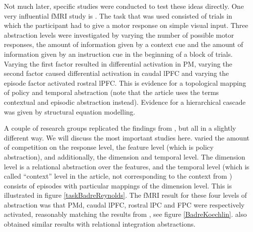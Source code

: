 \documentclass[10pt,a4paper]{report}
\begin{document}
Not much later, specific studies were conducted to test these ideas directly. One very influential fMRI study is \citet{Koechlin2003}. The task that was used consisted of trials in which the participant had to give a motor response on simple visual input. Three abstraction levels were investigated by varying the number of possible motor responses, the amount of information given by a context cue and the amount of information given by an instruction cue in the beginning of a block of trials. Varying the first factor resulted in differential activation in PM, varying the second factor caused differential activation in caudal lPFC and varying the episode factor activated rostral lPFC. This is evidence for a topological mapping of policy and temporal abstraction (note that the article uses the terms contextual and episodic abstraction instead). Evidence for a hierarchical cascade was given by structural equation modelling. 

A couple of research groups replicated the findings from \citet{Koechlin2003}, but all in a slightly different way. We will discuss the most important studies here. \citet{Badre2007} varied the amount of competition on the response level, the feature level (which is policy abstraction), and additionally, the dimension and temporal level. The dimension level is a relational abstraction over the features, and the temporal level (which is called ``context'' level in the article, not corresponding to the context from \citet{Koechlin2003}) consists of episodes with particular mappings of the dimension level. This is illustrated in figure \ref{taskBadreReynolds}. The fMRI result for these four levels of abstraction was that PMd, caudal lPFC, rostral lPC and FPC were respectively activated, reasonably matching the results from \citet{Koechlin2003}, see figure \ref{BadreKoechlin}. \citet{Krawczyk2011} also obtained similar results with relational integration abstractions.
\end{document}
